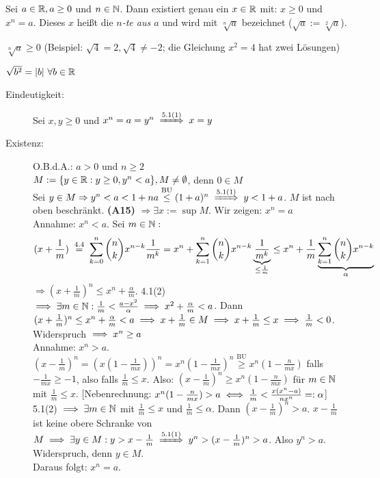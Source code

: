 \documentclass[a4paper,twoside,DIV15,BCOR12mm]{scrbook}
\begin{document}
\begin{wichtigedefinition}[Wurzeln]
Sei $a\in\mathbb{R}, a\ge0$ und $n\in\mathbb{N}$. Dann existiert genau ein $x\in\mathbb{R}$ mit: $x\ge0$ und $x^{n}=a$. Dieses $x$ heißt die \textit{$n$-te  aus $a$} und wird mit $\sqrt[n]{a}$ bezeichnet ($\sqrt{a} := \sqrt[2]{a}$).
\end{wichtigedefinition}

\begin{bemerkung}
\begin{liste}
\item $\sqrt[n]{a}\ge0$ (Beispiel: $\sqrt{4}=2, \sqrt{4}\ne-2$; die Gleichung $x^{2}=4$ hat zwei Lösungen)
\item $\sqrt{b^{2}}=|b|  \ \forall b\in\mathbb{R}$
\end{liste}
\end{bemerkung}

\begin{beweis}
\begin{description}
\item[Eindeutigkeit:] Sei $x,y\ge0$ und $x^{n}=a=y^{n}\folgtwegen{5.1(1)} x=y$
\item[Existenz:] O.B.d.A.: $a>0$ und $n\ge2$\\
$M:=\{y\in\mathbb{R}:y\ge0, y^{n}<a\}, M\ne\emptyset$, denn $0\in M$\\
Sei $y\in M\Rightarrow y^{n}<a<1+na\stackrel{\text{BU}}{\le}(1+a)^{n} \folgtwegen{5.1(1)} y<1+a$. $M$ ist nach oben beschränkt. \textbf{(A15)} $\Rightarrow \exists x:=\sup{M}$. Wir zeigen: $x^{n}=a$\\
Annahme: $x^{n}<a$. Sei $m\in\mathbb{N}:$ \[(x+\frac{1}{m})\gleichwegen{4.4}\sum_{k=0}^{n}\binom{n}{k}x^{n-k}\frac{1}{m^{k}}=x^{n}+\sum_{k=1}^{n}\binom{n}{k}x^{n-k}\underbrace{\frac{1}{m^{k}}}_{\le\frac{1}{m}}\le x^{n}+\frac{1}{m}\underbrace{\sum_{k=1}^{n}\binom{n}{k}x^{n-k}}_{\alpha}\]
$\Rightarrow(x+\frac{1}{m})^{n}\le x^{n}+\frac{\alpha}{m}$. 4.1(2) $\implies \exists m \in \mathbb{N}: \frac{1}{m} < \frac{a-x^2}{\alpha} \implies x^2 + \frac{\alpha}m < a$. Dann $(x+\frac{1}m)^n \le x^n + \frac{\alpha}{m} < a \implies x + \frac{1}{m} \in M \implies x+\frac{1}{m} \le x \implies \frac{1}{m} <0 $. Widerspruch $\implies x^n \ge a$ \\
Annahme: $x^n>a$. $(x-\frac{1}{m})^n = (x(1-\frac{1}{mx}))^n = x^n(1-\frac{1}{mx})^n \stackrel{\text{BU}}{\ge} x^n(1-\frac{n}{mx})$ falls $-\frac{1}{mx} \ge -1$, also falls $\frac{1}{m} \le x $. Also: $(x-\frac{1}{m})^n \ge x^n(1-\frac{n}{mx})$ für $m\in\mathbb{N}$ mit $\frac{1}{m} \le x$. [Nebenrechnung: $x^n(1-\frac{n}{mx}) > a \iff \frac{1}{m} < \frac{x(x^n-a)}{nx^n} =: \alpha$] 5.1(2) $\implies \exists m\in\mathbb{N}$ mit $\frac{1}{m} \le x$ und $\frac{1}{m} \le \alpha$. Dann $(x-\frac{1}{m})^n > a$. $x-\frac{1}{m}$ ist keine obere Schranke von $M \folgt \exists y \in M: y> x - \frac{1}{m} \folgtnach{5.1(1)} y^n > (x-\frac{1}{m})^n >a$. Also $y^n>a$. Widerspruch, denn $y\in M$.\\
Daraus folgt: $x^n = a$.
\end{description}
\end{beweis}
\end{document}
